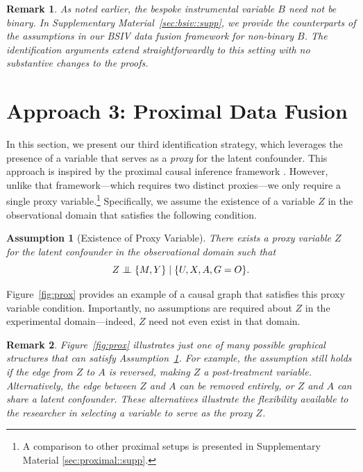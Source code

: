 \documentclass[10pt]{article}
\newtheorem{remark}{Remark}
\newtheorem{assumption}{Assumption}
\newcommand{\independent}{\perp\mkern-9.5mu\perp}
\begin{document}
\begin{remark}
\label{rmk:nonbinary_BSIV}
As noted earlier, the bespoke instrumental variable \( B \) need not be binary. In Supplementary Material~\ref{sec:bsiv::supp}, we provide the counterparts of the assumptions in our BSIV data fusion framework for non-binary \( B \). The identification arguments extend straightforwardly to this setting with no substantive changes to the proofs.
\end{remark}


\section{Approach 3: Proximal Data Fusion}
\label{sec:proximal}

In this section, we present our third identification strategy, which leverages the presence of a variable that serves as a \emph{proxy} for the latent confounder. This approach is inspired by the proximal causal inference framework \citep{miao2018identifying, tchetgen2020introduction, cui2020semiparametric}. However, unlike that framework---which requires two distinct proxies---we only require a single proxy variable.\footnote{A comparison to other proximal setups is presented in Supplementary Material \ref{sec:proximal::supp}.} Specifically, we assume the existence of a variable \( Z \) in the observational domain that satisfies the following condition.





\begin{assumption}[Existence of Proxy Variable]
\label{assumption:proxy}
There exists a proxy variable \( Z \) for the latent confounder in the observational domain such that
\[
Z \independent \{M, Y\} \mid \{U, X, A, G=O\}.
\]
\end{assumption}

Figure~\ref{fig:prox} provides an example of a causal graph that satisfies this proxy variable condition. Importantly, no assumptions are required about \( Z \) in the experimental domain---indeed, \( Z \) need not even exist in that domain.

\begin{remark}
\label{rmk:proxyflexy}
Figure~\ref{fig:prox} illustrates just one of many possible graphical structures that can satisfy Assumption~\ref{assumption:proxy}. For example, the assumption still holds if the edge from \( Z \) to \( A \) is reversed, making \( Z \) a post-treatment variable. Alternatively, the edge between \( Z \) and \( A \) can be removed entirely, or \( Z \) and \( A \) can share a latent confounder. These alternatives illustrate the flexibility available to the researcher in selecting a variable to serve as the proxy \( Z \).
\end{remark}
\end{document}

